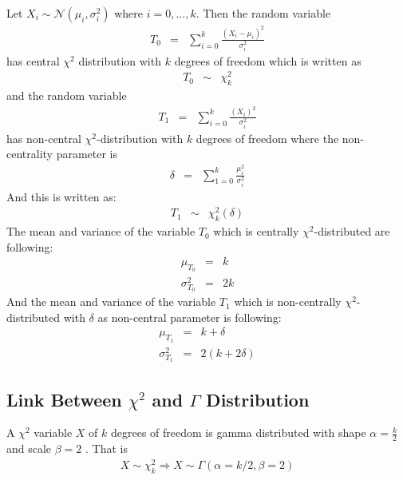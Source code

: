 \newline
\begin{defn}
\label{defn:chi_square_distribution}
\cite{distribution_cryptanalysis_kaisa_lecture_ice_break_2013} Let $X_i \sim \mathcal{N}(\mu_i,\sigma^2_i)$ where $i = 0, . . . ,k$. Then the random variable
\begin{eqnarray}
T_0 &=& \displaystyle\sum_{i=0}^{k}\frac{(X_i - \mu_i)^2}{\sigma^2_i} 
\end{eqnarray} has central $\chi^2$ distribution with $k$ degrees of freedom which is written as 
\begin{eqnarray}
T_0 &\sim & \chi^2_{k} \label{eqn:chi_square_distribution_central}
\end{eqnarray}
and the random variable 
\begin{eqnarray}
T_1 &=& \displaystyle\sum_{i=0}^{k}\frac{(X_i)^2}{\sigma^2_i} 
\end{eqnarray} has non-central $\chi^2$-distribution with $k$ degrees of freedom where the non-centrality parameter is
\begin{eqnarray}
\delta &=& \displaystyle\sum_{1=0}^{k}\frac{\mu_i^2}{\sigma_i^2} \label{eqn:chi_square_non_centrality}
\end{eqnarray} And this is written as:
\begin{eqnarray}
T_1 &\sim & \chi^2_{k}(\delta) \label{eqn:chi_square_distribution_non_central}
\end{eqnarray}
The mean and variance of the variable $T_0$ which is centrally $\chi^2$-distributed are following:
\begin{eqnarray}
\mu_{T_0} &=& k \label{eqn:chi_square_central_mean}\\
\sigma^2_{T_0} &=& 2k \label{eqn:chi_square_central_variance} 
\end{eqnarray} And the mean and variance of the variable $T_1$ which is non-centrally $\chi^2$-distributed with $\delta$ as non-central parameter is following:
\begin{eqnarray}
\mu_{T_1} &=& k + \delta \label{eqn:chi_square_non_central_mean}\\
\sigma^2_{T_1} &=& 2(k + 2\delta) \label{eqn:chi_square_central_mean}
\end{eqnarray}
\end{defn}
\subsection{Link Between $\chi^2$ and $\Gamma$ Distribution}
A $\chi^2$ variable $X$ of $k$ degrees of freedom is gamma distributed with shape $\alpha = \frac{k}{2}$ and scale $\beta=2$ \citep{chi_gamma_link_book}. That is
\begin{eqnarray}
X \sim \chi^2_{k} \Rightarrow X \sim \Gamma \left(\alpha= k/2, \beta= 2 \right) \label{eqn:link_chi_gamma}
\end{eqnarray}

